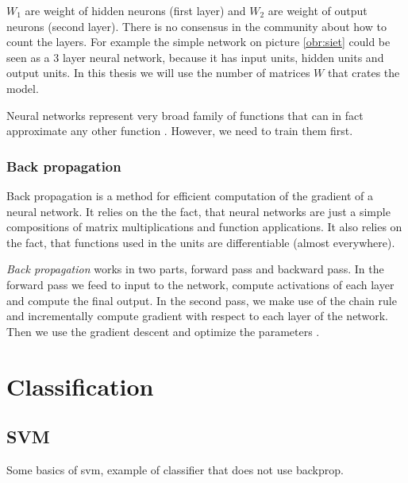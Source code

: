         $W_1$ are weight of hidden neurons (first layer) and $W_2$ are weight of output neurons (second layer).
        There is no consensus in the community about how to count the layers. 
        For example the simple network on picture \ref{obr:siet} could be seen as a $3$ layer neural network,
        because it has input units, hidden units and output units.
        In this thesis we will use the number of matrices $W$ that crates the model.
        
        Neural networks represent very broad family of functions that can in fact approximate any other function \cite{cybenko1989approximation}.
        However, we need to train them first.
        
        \subsubsection{Back propagation}
        
        Back propagation is a method for efficient computation of the gradient of a neural network.
        It relies on the the fact, that neural networks are just a simple compositions of matrix multiplications and function applications. 
        It also relies on the fact, that functions used in the units are differentiable (almost everywhere).
        
        \textit{Back propagation} works in two parts, forward pass and backward pass.
        In the forward pass we feed to input to the network, compute activations of each layer and compute the final output.
        In the second pass, we make use of the chain rule and incrementally compute gradient with respect to each layer of the network.
        Then we use the gradient descent and optimize the parameters \cite{rumelhart1986david}.
        
        \* %
        
    \section{Classification}
        \subsection{SVM}
            \* %
            Some basics of svm, example of classifier that does not use backprop.
